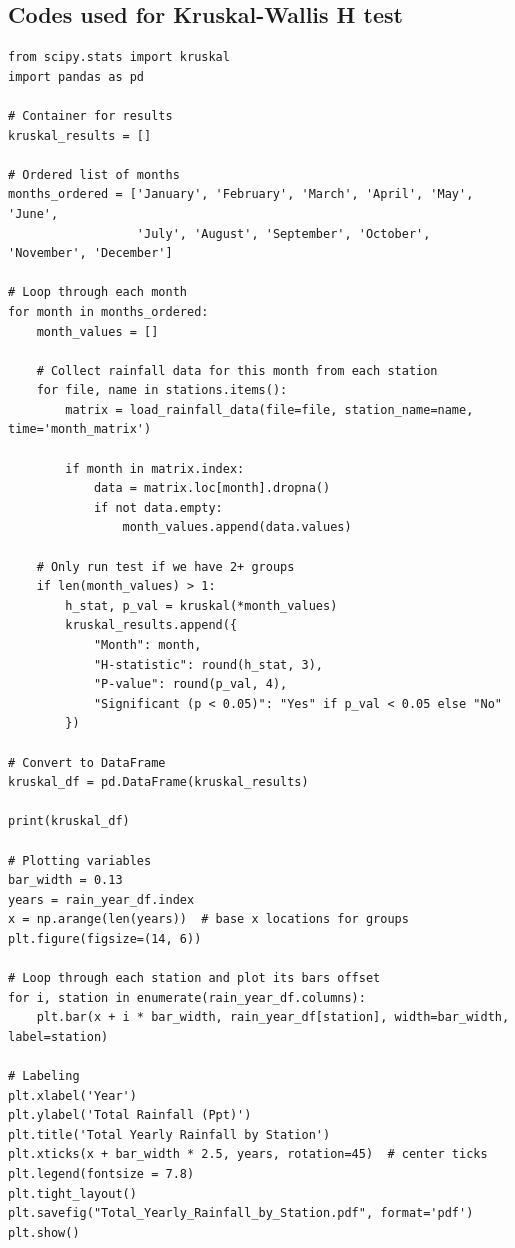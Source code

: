 \documentclass[12pt]{article}
\theoremstyle{definition}
\begin{document}
\subsection{Codes used for Kruskal-Wallis H test}
\begin{verbatim}
from scipy.stats import kruskal
import pandas as pd

# Container for results
kruskal_results = []

# Ordered list of months
months_ordered = ['January', 'February', 'March', 'April', 'May', 'June',
                  'July', 'August', 'September', 'October', 'November', 'December']

# Loop through each month
for month in months_ordered:
    month_values = []

    # Collect rainfall data for this month from each station
    for file, name in stations.items():
        matrix = load_rainfall_data(file=file, station_name=name, time='month_matrix')

        if month in matrix.index:
            data = matrix.loc[month].dropna()
            if not data.empty:
                month_values.append(data.values)

    # Only run test if we have 2+ groups
    if len(month_values) > 1:
        h_stat, p_val = kruskal(*month_values)
        kruskal_results.append({
            "Month": month,
            "H-statistic": round(h_stat, 3),
            "P-value": round(p_val, 4),
            "Significant (p < 0.05)": "Yes" if p_val < 0.05 else "No"
        })

# Convert to DataFrame
kruskal_df = pd.DataFrame(kruskal_results)

print(kruskal_df)

# Plotting variables
bar_width = 0.13
years = rain_year_df.index
x = np.arange(len(years))  # base x locations for groups
plt.figure(figsize=(14, 6))

# Loop through each station and plot its bars offset
for i, station in enumerate(rain_year_df.columns):
    plt.bar(x + i * bar_width, rain_year_df[station], width=bar_width, label=station)

# Labeling
plt.xlabel('Year')
plt.ylabel('Total Rainfall (Ppt)')
plt.title('Total Yearly Rainfall by Station')
plt.xticks(x + bar_width * 2.5, years, rotation=45)  # center ticks
plt.legend(fontsize = 7.8)
plt.tight_layout()
plt.savefig("Total_Yearly_Rainfall_by_Station.pdf", format='pdf')
plt.show()
\end{verbatim}
\end{document}
